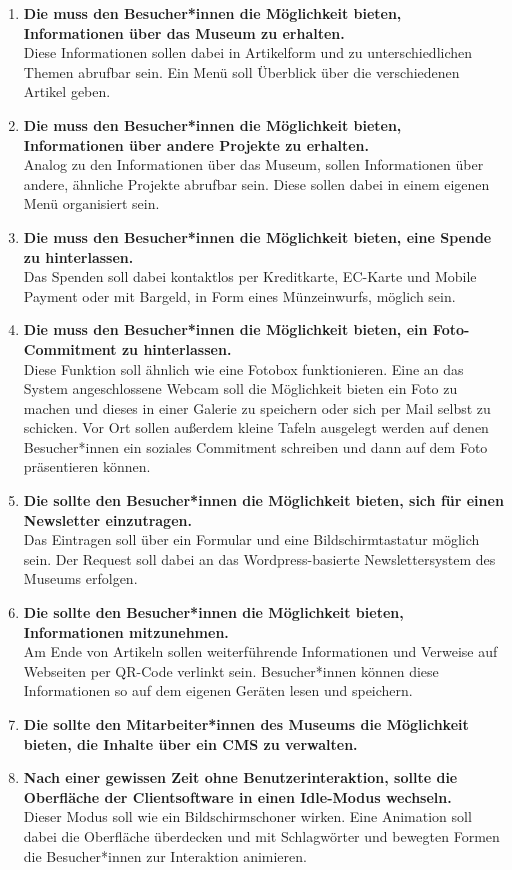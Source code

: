 \begin{enumerate}[label=\textbf{FA\arabic*}]
	\item\label{fa1} \textbf{Die \shst{} muss den Besucher*innen die Möglichkeit bieten, Informationen über das Museum zu erhalten.}\\
  Diese Informationen sollen dabei in Artikelform und zu unterschiedlichen Themen abrufbar sein. Ein Menü soll Überblick über 
  die verschiedenen Artikel geben. 
	\item\label{fa2} \textbf{Die \shst{} muss den Besucher*innen die Möglichkeit bieten, Informationen über andere Projekte zu erhalten.}\\
  Analog zu den Informationen über das Museum, sollen Informationen über andere, ähnliche Projekte abrufbar sein. Diese sollen dabei
  in einem eigenen Menü organisiert sein.
  \item\label{fa3} \textbf{Die \shst{} muss den Besucher*innen die Möglichkeit bieten, eine Spende zu hinterlassen.}\\
  Das Spenden soll dabei kontaktlos per Kreditkarte, EC-Karte und Mobile Payment oder mit Bargeld, in Form eines Münzeinwurfs, möglich sein.
  \item\label{fa4} \textbf{Die \shst{} muss den Besucher*innen die Möglichkeit bieten, ein Foto-Commitment zu hinterlassen.}\\
  Diese Funktion soll ähnlich wie eine Fotobox funktionieren. Eine an das System angeschlossene Webcam soll die Möglichkeit bieten ein Foto 
  zu machen und dieses in einer Galerie zu speichern oder sich per Mail selbst zu schicken. Vor Ort sollen außerdem kleine Tafeln ausgelegt werden
  auf denen Besucher*innen ein soziales Commitment schreiben und dann auf dem Foto präsentieren können. 
  \item\label{fa5} \textbf{Die \shst{} sollte den Besucher*innen die Möglichkeit bieten, sich für einen Newsletter einzutragen.}\\ %
  Das Eintragen soll über ein Formular und eine Bildschirmtastatur möglich sein. Der Request soll dabei an das Wordpress-basierte 
  Newslettersystem des Museums erfolgen. 
  \item\label{fa6} \textbf{Die \shst{} sollte den Besucher*innen die Möglichkeit bieten, Informationen mitzunehmen.}\\
  Am Ende von Artikeln sollen weiterführende Informationen und Verweise auf Webseiten per QR-Code verlinkt sein. Besucher*innen können diese 
  Informationen so auf dem eigenen Geräten lesen und speichern. 
  \item\label{fa7} \textbf{Die \shst{} sollte den Mitarbeiter*innen des Museums die Möglichkeit bieten, die Inhalte über ein CMS zu verwalten.}
  \item\label{fa8} \textbf{Nach einer gewissen Zeit ohne Benutzerinteraktion, sollte die Oberfläche der Clientsoftware in einen
  Idle-Modus wechseln.}\\
  Dieser Modus soll wie ein Bildschirmschoner wirken. Eine Animation soll dabei die Oberfläche überdecken und mit Schlagwörter und bewegten Formen
  die Besucher*innen zur Interaktion animieren. 
\end{enumerate}
